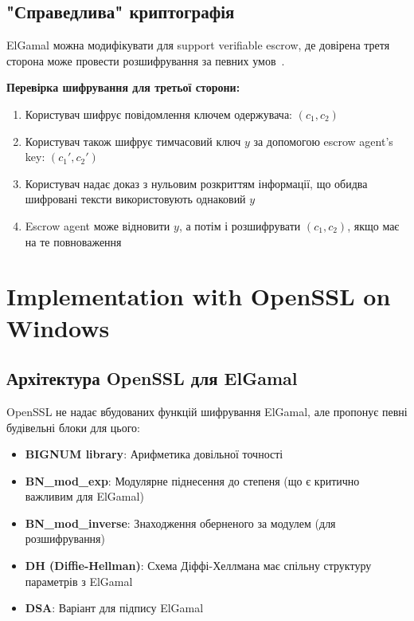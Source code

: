 \subsection{"Справедлива"{} криптографія}

ElGamal можна модифікувати для support verifiable escrow, де довірена третя сторона може провести розшифрування за 
певних умов~\cite{micali1996fair}.

\textbf{Перевірка шифрування для третьої сторони:}
\begin{enumerate}
    \item Користувач шифрує повідомлення ключем одержувача: $(c_1, c_2)$
    \item Користувач також шифрує тимчасовий ключ $y$ за допомогою escrow agent's key: $(c_1', c_2')$
    \item Користувач надає доказ з нульовим розкриттям інформації, що обидва шифровані тексти використовують 
        однаковий $y$
    \item Escrow agent може відновити $y$, а потім і розшифрувати $(c_1, c_2)$, якщо має на те повноваження
\end{enumerate}

\section{Implementation with OpenSSL on Windows}

\subsection{Архітектура OpenSSL для ElGamal}

OpenSSL не надає вбудованих функцій шифрування ElGamal, але пропонує певні будівельні блоки для цього:

\begin{itemize}
    \item \textbf{BIGNUM library}: Арифметика довільної точності
    \item \textbf{BN\_mod\_exp}: Модулярне піднесення до степеня (що є критично важливим для ElGamal)
    \item \textbf{BN\_mod\_inverse}: Знаходження оберненого за модулем (для розшифрування)
    \item \textbf{DH (Diffie-Hellman)}: Схема Діффі-Хеллмана має спільну структуру параметрів з ElGamal
    \item \textbf{DSA}: Варіант для підпису ElGamal
\end{itemize}

